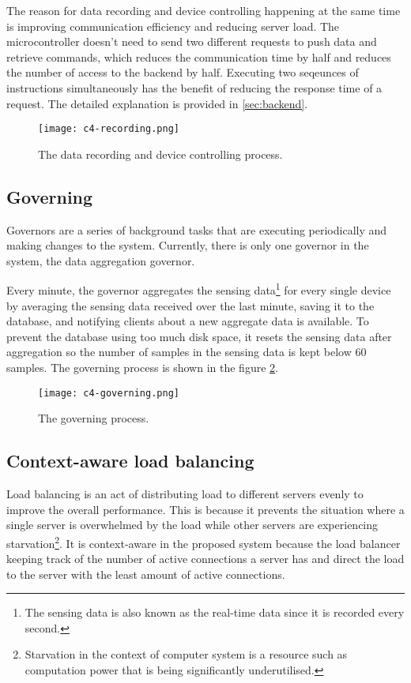 \documentclass[../thesis.tex]{subfiles}
\begin{document}
The reason for data recording and device controlling happening at the same time is improving communication efficiency and reducing server load. The microcontroller doesn't need to send two different requests to push data and retrieve commands, which reduces the communication time by half and reduces the number of access to the backend by half. 
\newpage
Executing two seqeunces of instructions simultaneously has the benefit of reducing the response time of a request. The detailed explanation is provided in \autoref{sec:backend}.

\begin{figure}[!ht]
	\centering
	\texttt{[image: c4-recording.png]}
	\caption{The data recording and device controlling process.}
	\label{fig:record}
\end{figure}

\subsection{Governing}
\label{sec:governor}

Governors are a series of background tasks that are executing periodically and making changes to the system. Currently, there is only one governor in the system, the data aggregation governor.

Every minute, the governor aggregates the sensing data\footnote{The sensing data is also known as the real-time data since it is recorded every second.} for every single device by averaging the sensing data received over the last minute, saving it to the database, and notifying clients about a new aggregate data is available. To prevent the database using too much disk space, it resets the sensing data after aggregation so the number of samples in the sensing data is kept below 60 samples. The governing process is shown in the figure \ref{fig:governing}.

\begin{figure}[!ht]
	\centering
	\texttt{[image: c4-governing.png]}
	\caption{The governing process.}
	\label{fig:governing}
\end{figure}

\subsection{Context-aware load balancing}

Load balancing is an act of distributing load to different servers evenly to improve the overall performance. This is because it prevents the situation where a single server is overwhelmed by the load while other servers are experiencing starvation\footnote{Starvation in the context of computer system is a resource such as computation power that is being significantly underutilised.}. It is context-aware in the proposed system because the load balancer keeping track of the number of active connections a server has and direct the load to the server with the least amount of active connections. 
\end{document}
